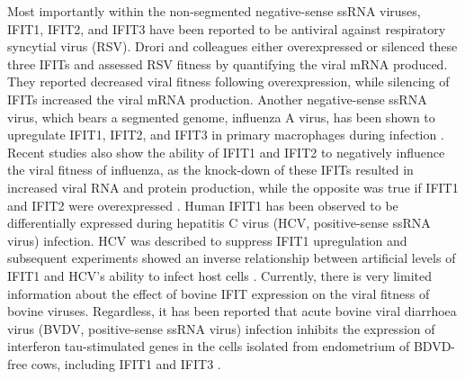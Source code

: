 Most importantly within the non-segmented negative-sense ssRNA viruses, IFIT1, IFIT2, and IFIT3 have been reported to be antiviral against respiratory syncytial virus (RSV). Drori and colleagues either overexpressed or silenced these three IFITs and assessed RSV fitness by quantifying the viral mRNA produced. They reported decreased viral fitness following overexpression, while silencing of IFITs increased the viral mRNA production. Another negative-sense ssRNA virus, which bears a segmented genome, influenza A virus, has been shown to upregulate IFIT1, IFIT2, and IFIT3 in primary macrophages during infection \cite{Lietzen2011QuantitativeMacrophages}. Recent studies also show the ability of IFIT1 and IFIT2 to negatively influence the viral fitness of influenza, as the knock-down of these IFITs resulted in increased viral RNA and protein production, while the opposite was true if IFIT1 and IFIT2 were overexpressed \cite{Zhu2023TheSynthesis}. Human IFIT1 has been observed to be differentially expressed during hepatitis C virus (HCV, positive-sense ssRNA virus) infection. HCV was described to suppress IFIT1 upregulation and subsequent experiments showed an inverse relationship between artificial levels of IFIT1 and HCV's ability to infect host cells \cite{Raychoudhuri2011ISG56Replication, Ishida2019HepaticInfection}. Currently, there is very limited information about the effect of bovine IFIT expression on the viral fitness of bovine viruses. Regardless, it has been reported that acute bovine viral diarrhoea virus (BVDV, positive-sense ssRNA virus) infection inhibits the expression of interferon tau-stimulated genes in the cells isolated from endometrium of BDVD-free cows, including IFIT1 and IFIT3 \cite{Cheng2017AcuteEndometrium}.

